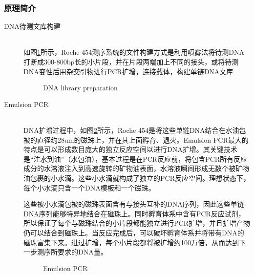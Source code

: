 \documentclass[12pt]{article} %
\begin{document}
\subsubsection{原理简介}
\begin{description}
	\item[DNA待测文库构建] \hfill \\
	 如图\ref{fig:rochea}所示，Roche 454测序系统的文件构建方式是利用喷雾法将待测DNA打断成300-800bp长的小片段，并在片段两端加上不同的接头，或将待测DNA变性后用杂交引物进行PCR扩增，连接载体，构建单链DNA文库
	\begin{figure}[H] %
		\caption{DNA library preparation}
		\label{fig:rochea}
	\end{figure}
	
	\item[Emulsion PCR] \hfill \\
	 DNA扩增过程中，如图\ref{fig:rocheb}所示，Roche 454是将这些单链DNA结合在水油包被的直径约28um的磁珠上，并在其上面孵育、退火。Emulsion PCR最大的特点是可以形成数目庞大的独立反应空间以进行DNA扩增。其关键技术是“注水到油”（水包油），基本过程是在PCR反应前，将包含PCR所有反应成分的水溶液注入到高速旋转的矿物油表面，水溶液瞬间形成无数个被矿物油包裹的小水滴。这些小水滴就构成了独立的PCR反应空间。理想状态下，每个小水滴只含一个DNA模板和一个磁珠。


	这些被小水滴包被的磁珠表面含有与接头互补的DNA序列，因此这些单链DNA序列能够特异地结合在磁珠上。同时孵育体系中含有PCR反应试剂，所以保证了每个与磁珠结合的小片段都能独立进行PCR扩增，并且扩增产物仍可以结合到磁珠上。当反应完成后，可以破坏孵育体系并将带有DNA的磁珠富集下来。进过扩增，每个小片段都将被扩增约100万倍，从而达到下一步测序所要求的DNA量。

	\begin{figure}[H] %
	\caption{Emulsion PCR}
	\label{fig:rocheb}
\end{figure}


\end{description}
\end{document}
